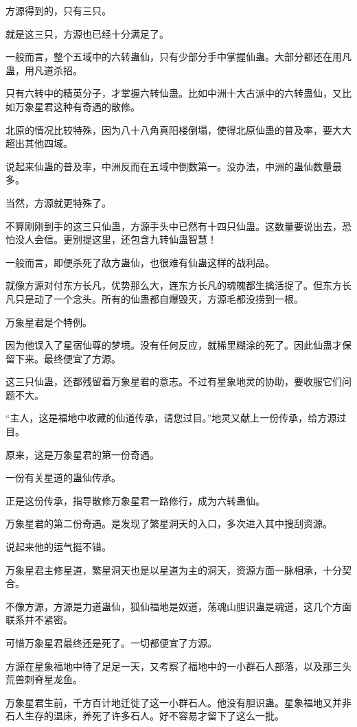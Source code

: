 \begin{this_body}
方源得到的，只有三只。

就是这三只，方源也已经十分满足了。

一般而言，整个五域中的六转蛊仙，只有少部分手中掌握仙蛊。大部分都还在用凡蛊，用凡道杀招。

只有六转中的精英分子，才掌握六转仙蛊。比如中洲十大古派中的六转蛊仙，又比如万象星君这种有奇遇的散修。

北原的情况比较特殊，因为八十八角真阳楼倒塌，使得北原仙蛊的普及率，要大大超出其他四域。

说起来仙蛊的普及率，中洲反而在五域中倒数第一。没办法，中洲的蛊仙数量最多。

当然，方源就更特殊了。

不算刚刚到手的这三只仙蛊，方源手头中已然有十四只仙蛊。这数量要说出去，恐怕没人会信。更别提这里，还包含九转仙蛊智慧！

一般而言，即便杀死了敌方蛊仙，也很难有仙蛊这样的战利品。

就像方源对付东方长凡，优势那么大，连东方长凡的魂魄都生擒活捉了。但东方长凡只是动了一个念头。所有的仙蛊都自爆毁灭，方源毛都没捞到一根。

万象星君是个特例。

因为他误入了星宿仙尊的梦境。没有任何反应，就稀里糊涂的死了。因此仙蛊才保留下来。最终便宜了方源。

这三只仙蛊，还都残留着万象星君的意志。不过有星象地灵的协助，要收服它们问题不大。

“主人，这是福地中收藏的仙道传承，请您过目。”地灵又献上一份传承，给方源过目。

原来，这是万象星君的第一份奇遇。

一份有关星道的蛊仙传承。

正是这份传承，指导散修万象星君一路修行，成为六转蛊仙。

万象星君的第二份奇遇。是发现了繁星洞天的入口，多次进入其中搜刮资源。

说起来他的运气挺不错。

万象星君主修星道，繁星洞天也是以星道为主的洞天，资源方面一脉相承，十分契合。

不像方源，方源是力道蛊仙，狐仙福地是奴道，荡魂山胆识蛊是魂道，这几个方面联系并不紧密。

可惜万象星君最终还是死了。一切都便宜了方源。

方源在星象福地中待了足足一天，又考察了福地中的一小群石人部落，以及那三头荒兽刺脊星龙鱼。

万象星君生前，千方百计地迁徙了这一小群石人。他没有胆识蛊。星象福地又并非石人生存的温床，养死了许多石人。好不容易才留下了这么一批。


\end{this_body}
